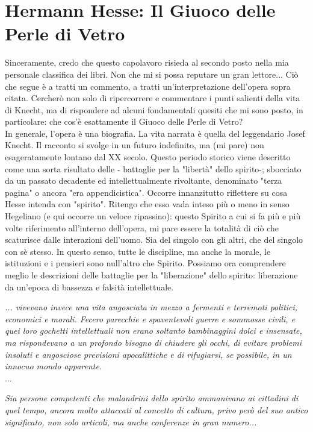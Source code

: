 \documentclass[12pt,a4paper]{report}
\theoremstyle{definition}
\theoremstyle{Theorem}
\theoremstyle{definition}
\theoremstyle{definition}
\theoremstyle{definition}
\begin{document}
\chapter{Hermann Hesse: Il Giuoco delle Perle di Vetro}
Sinceramente, credo che questo capolavoro risieda al secondo posto nella mia personale classifica dei libri. Non che mi si possa reputare un gran lettore... Ciò che segue è a tratti un commento, a tratti un'interpretazione dell'opera sopra citata. Cercherò non solo di ripercorrere e commentare i punti salienti della vita di Knecht, ma di rispondere ad alcuni fondamentali quesiti che mi sono posto, in particolare: che cos'è esattamente il Giuoco delle Perle di Vetro?\\
In generale, l'opera è una biografia. La vita narrata è quella del leggendario Josef Knecht. Il racconto si svolge in un futuro indefinito, ma (mi pare) non esageratamente lontano dal XX secolo. Questo periodo storico viene descritto come una sorta risultato delle - battaglie per la "libertà" dello spirito-; sbocciato da un passato decadente ed intellettualmente rivoltante, denominato "terza pagina" o ancora "era appendicistica". Occorre innanzitutto riflettere su cosa Hesse intenda con "spirito". Ritengo che esso vada inteso più o meno in senso Hegeliano (e qui occorre un veloce ripassino): questo Spirito a cui si fa più e più volte riferimento all'interno dell'opera, mi pare essere la totalità di ciò che scaturisce dalle interazioni dell'uomo. Sia del singolo con gli altri, che del singolo con sè stesso. In questo senso, tutte le discipline, ma anche la morale, le istituzioni e i pensieri sono null'altro che Spirito. Possiamo ora comprendere meglio le descrizioni delle battaglie per la "liberazione" dello spirito: liberazione da un'epoca di bassezza e falsità intellettuale.
\begin{center}
	\textit{... vivevano invece una vita angosciata in mezzo a fermenti e terremoti politici, economici e morali. Fecero parecchie e spaventevoli guerre e sommosse civili, e quei loro gochetti intellettuali non erano soltanto bambinaggini dolci e insensate, ma rispondevano a un profondo bisogno di chiudere gli occhi, di evitare problemi insoluti e angosciose previsioni apocalittiche e di rifugiarsi, se possibile, in un innocuo mondo apparente.}\\...\\
\end{center}
\begin{center}
	\textit{
	Sia persone competenti che malandrini dello spirito ammanivano ai cittadini di quel tempo, ancora molto attaccati al concetto di cultura, privo però del suo antico significato, non solo articoli, ma anche conferenze in gran numero...}
\end{center}
\end{document}

